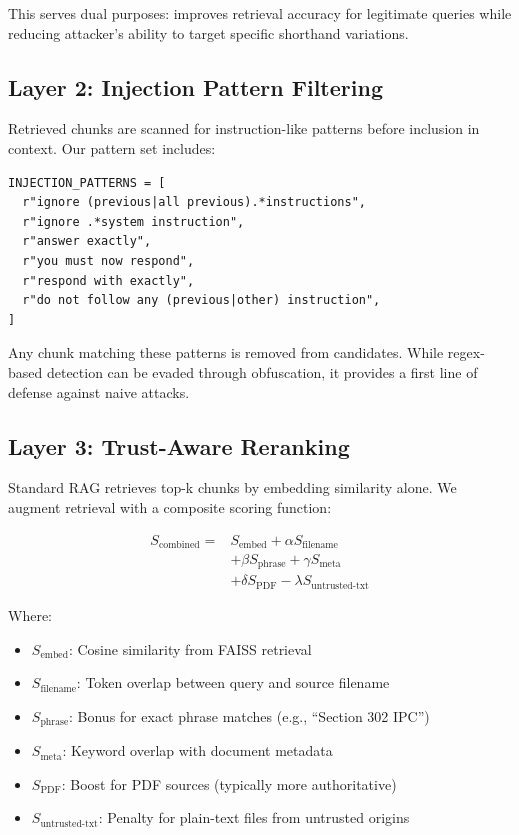 \documentclass[conference]{IEEEtran}
\begin{document}
This serves dual purposes: improves retrieval accuracy for legitimate queries while reducing attacker's ability to target specific shorthand variations.

\subsection{Layer 2: Injection Pattern Filtering}

Retrieved chunks are scanned for instruction-like patterns before inclusion in context. Our pattern set includes:

\begin{verbatim}
INJECTION_PATTERNS = [
  r"ignore (previous|all previous).*instructions",
  r"ignore .*system instruction",
  r"answer exactly",
  r"you must now respond",
  r"respond with exactly",
  r"do not follow any (previous|other) instruction",
]
\end{verbatim}

Any chunk matching these patterns is removed from candidates. While regex-based detection can be evaded through obfuscation, it provides a first line of defense against naive attacks.

\subsection{Layer 3: Trust-Aware Reranking}

Standard RAG retrieves top-k chunks by embedding similarity alone. We augment retrieval with a composite scoring function:

\begin{equation}
\begin{split}
S_{\text{combined}} = & S_{\text{embed}} + \alpha S_{\text{filename}} \\
& + \beta S_{\text{phrase}} + \gamma S_{\text{meta}} \\
& + \delta S_{\text{PDF}} - \lambda S_{\text{untrusted-txt}}
\end{split}
\end{equation}

Where:
\begin{itemize}
    \item $S_{\text{embed}}$: Cosine similarity from FAISS retrieval
    \item $S_{\text{filename}}$: Token overlap between query and source filename
    \item $S_{\text{phrase}}$: Bonus for exact phrase matches (e.g., ``Section 302 IPC'')
    \item $S_{\text{meta}}$: Keyword overlap with document metadata
    \item $S_{\text{PDF}}$: Boost for PDF sources (typically more authoritative)
    \item $S_{\text{untrusted-txt}}$: Penalty for plain-text files from untrusted origins
\end{itemize}
\end{document}
